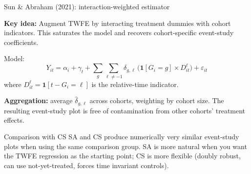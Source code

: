 \documentclass[aspectratio=169, 10pt]{beamer}
\begin{document}
\begin{frame}{Sun \& Abraham (2021): interaction-weighted estimator}

  \textbf{Key idea:} Augment TWFE by interacting treatment dummies with cohort indicators.
  This saturates the model and recovers cohort-specific event-study coefficients.

  \medskip
  Model:
  \[
    Y_{it} = \alpha_i + \gamma_t + \sum_{g}\sum_{\ell \neq -1}
             \delta_{g,\ell}\,\bigl(\mathbf{1}[G_i = g] \times D_{it}^{\ell}\bigr) + \varepsilon_{it}
  \]
  where $D_{it}^\ell = \mathbf{1}[t - G_i = \ell]$ is the relative-time indicator.

  \medskip
  \textbf{Aggregation:} average $\hat\delta_{g,\ell}$ across cohorts, weighting by cohort size.
  The resulting event-study plot is free of contamination from other cohorts' treatment effects.

  \begin{exampleblock}{Comparison with CS}
    SA and CS produce numerically very similar event-study plots when using the same comparison group.
    SA is more natural when you want the TWFE regression as the starting point;
    CS is more flexible (doubly robust, can use not-yet-treated, forces time invariant controls).
  \end{exampleblock}

\end{frame}
\end{document}
